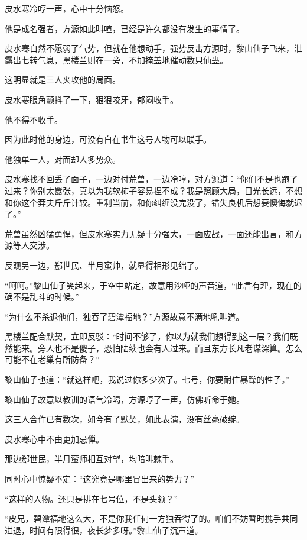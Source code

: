 
\begin{this_body}

皮水寒冷哼一声，心中十分恼怒。

他是成名强者，方源如此叫喧，已经是许久都没有发生的事情了。

皮水寒自然不愿弱了气势，但就在他想动手，强势反击方源时，黎山仙子飞来，泄露出七转气息，黑楼兰则在一旁，不加掩盖地催动数只仙蛊。

这明显就是三人夹攻他的局面。

皮水寒眼角颤抖了一下，狠狠咬牙，郁闷收手。

他不得不收手。

因为此时他的身边，可没有自在书生这号人物可以联手。

他独单一人，对面却人多势众。

皮水寒找不回丢了面子，一边对付荒兽，一边冷哼，对方源道：“你们不是也跑了过来？你别太嚣张，真以为我软柿子容易捏不成？我是照顾大局，目光长远，不想和你这个莽夫斤斤计较。重利当前，和你纠缠没完没了，错失良机后想要懊悔就迟了。”

荒兽虽然凶猛勇悍，但皮水寒实力无疑十分强大，一面应战，一面还能出言，和方源等人交涉。

反观另一边，郄世民、半月蛮帅，就显得相形见绌了。

“呵呵。”黎山仙子笑起来，于空中站定，故意用沙哑的声音道，“此言有理，现在的确不是乱斗的时候。”

“为什么不杀退他们，独吞了碧潭福地？”方源故意不满地吼叫道。

黑楼兰配合默契，立即反驳：“时间不够了，你以为就我们想得到这一层？我们既然能来。旁人也不是傻子，恐怕陆续也会有人过来。而且东方长凡老谋深算。怎么可能不在老巢有所防备？”

黎山仙子也道：“就这样吧，我说过你多少次了。七号，你要耐住暴躁的性子。”

黎山仙子故意以教训的语气冷喝，方源哼了一声，仿佛听命于她。

这三人合作已有数次，如今有了默契，如此表演，没有丝毫破绽。

皮水寒心中不由更加忌惮。

那边郄世民，半月蛮师相互对望，均暗叫棘手。

同时心中惊疑不定：“这究竟是哪里冒出来的势力？”

“这样的人物。还只是排在七号位，不是头领？”

“皮兄，碧潭福地这么大，不是你我任何一方独吞得了的。咱们不妨暂时携手共同进退，时间有限得很，夜长梦多呀。”黎山仙子沉声道。


\end{this_body}
